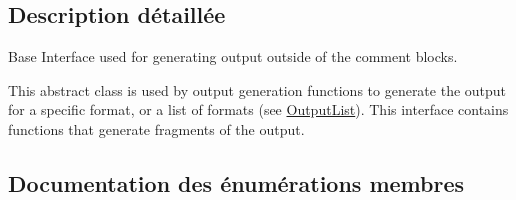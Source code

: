 \subsection{Description détaillée}
Base Interface used for generating output outside of the comment blocks.

This abstract class is used by output generation functions to generate the output for a specific format, or a list of formats (see \hyperlink{class_output_list}{Output\+List}). This interface contains functions that generate fragments of the output. 

\subsection{Documentation des énumérations membres}
\hypertarget{class_base_output_doc_interface_a944ed4d9fb389999c2724eeb321b8c8c}{}
